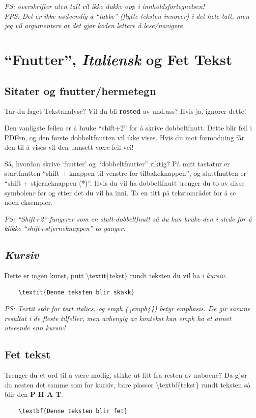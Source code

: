     \textit{PS: overskrifter uten tall vil ikke dukke opp i innholdsfortegnelsen!\\
    PPS: Det er ikke nødvendig å ``tabbe'' (flytte teksten innover) i det hele tatt, men jeg vil argumentere at det gjør koden lettere å lese/navigere.} 
    
\section{``Fnutter'', \textit{Italiensk} og Fet Tekst}
    
    \subsection{Sitater og fnutter/hermetegn}
        Tar du faget Tekstanalyse? Vil du bli \textbf{rosted} av und.ass? Hvis ja, ignorer dette!
    
        Den vanligste feilen er å bruke ``shift+2'' for å skrive dobbeltfnutt. Dette blir feil i PDFen, og den første dobbeltfnutten vil ikke vises. Hvis du mot formodning får den til å vises vil den uansett være feil vei! 
        
        Så, hvordan skrive `fnutter' og ``dobbeltfnutter'' riktig? 
        På mitt tastatur er startfnutten ``shift + knappen til venstre for tilbakeknappen'', og sluttfnutten er ``shift + stjerneknappen (*)''. Hvis du vil ha dobbeltfnutt trenger du to av disse symbolene før og etter det du vil ha inni. Ta en titt på tekstområdet for å se noen eksempler.
        
        \textit{PS: ``Shift+2'' fungerer som en slutt-dobbeltfnutt så du kan bruke den i stede for å klikke ``shift+stjerneknappen'' to ganger.}
        
    \subsection{\textit{Kursiv}}
        Dette er ingen kunst, putt \textbackslash textit\{tekst\} rundt teksten du vil ha i \textit{kursiv}. 
        \begin{verbatim}
    \textit{Denne teksten blir skakk}
        \end{verbatim}
        
        \textit{PS: Textit står for text italics, og emph (\textbackslash emph\{\}) betyr emphasis. De gir samme resultat i de fleste tilfeller, men avhengig av kontekst kan emph ha et annet utseende enn kursiv!}
        
    \subsection{Fet tekst}
        Trenger du et ord til å være modig, stikke ut litt fra resten av naboene? Da gjør du nesten det samme som for kursiv, bare plasser \textbackslash textbf\{tekst\} rundt teksten så blir den \textbf{P H A T}.
        \begin{verbatim}
    \textbf{Denne teksten blir fet}
        \end{verbatim}
        
